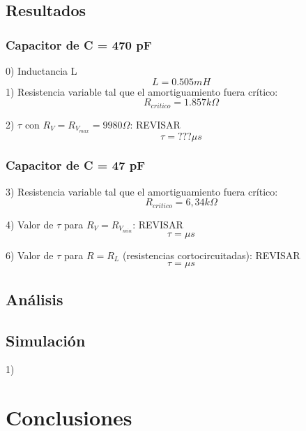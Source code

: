 \documentclass{article}
\begin{document}
            
        \subsection{Resultados}

            \subsubsection*{Capacitor de C = 470 pF}
                0) Inductancia L
                \begin{equation}
                    L=0.505mH
                \end{equation}
                1) Resistencia variable tal que el amortiguamiento fuera crítico:
                \begin{equation}
                    R_{critico} = 1.857 k\Omega
                \end{equation} \par
                2) $ \tau $ con $ R_V = R_{V_{max}} = 9980 \Omega $: REVISAR
                 \begin{equation}
                    \tau = ??? \mu s 
                \end{equation}

            \subsubsection*{Capacitor de C = 47 pF}
                3) Resistencia variable tal que el amortiguamiento fuera crítico:
                \begin{equation}
                    R_{critico} = 6,34 k\Omega 
                \end{equation} \par
                4) Valor de $ \tau $ para $ R_V = R_{V_{min}} $: REVISAR
                \begin{equation}
                    \tau =  \mu s 
                \end{equation} \par
                6) Valor de $ \tau $ para $ R = R_L $ (resistencias cortocircuitadas): REVISAR
                \begin{equation}
                    \tau =  \mu s 
                \end{equation}
        


    \subsection{Análisis}
        \subsection*{Simulación}
        1) 


\section{Conclusiones}
\end{document}

